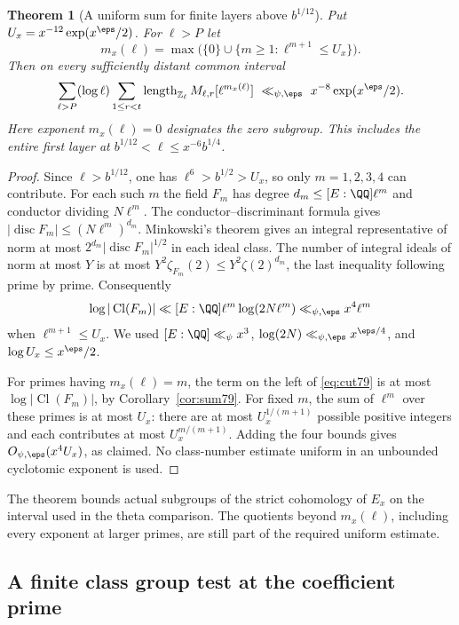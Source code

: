 \documentclass[a4paper,11pt]{article}
\newtheorem{theorem}[proposition]{Theorem}
\theoremstyle{definition}
\theoremstyle{remark}
\newcommand{\ZZ}{\mathbb Z}\newcommand{\ord}{\operatorname{ord}}
\newcommand{\len}{\operatorname{length}}\newcommand{\Res}{\operatorname*{Res}}
\numberwithin{equation}{section}
\newcommand{\Cl}{\operatorname{Cl}}
\begin{document}
\begin{theorem}[A uniform sum for finite layers above \(b^{1/12}\)]
\label{thm:cut79}
Put \(U_x=x^{-12}\exp(x^\eps/2)\). For \(\ell>P\) let
\[
  m_x(\ell)=\max\bigl(\{0\}\cup
                     \{m\ge1:\ell^{m+1}\le U_x\}\bigr).
\]
Then on every sufficiently distant common interval
\begin{equation}
 \sum_{\ell>P}(\log\ell)\sum_{1\le r<t}
       \len_{\ZZ_\ell} M_{\ell,r}[\ell^{m_x(\ell)}]
    \ \ll_{\psi,\eps}\ x^{-8}\exp(x^\eps/2).
 \label{eq:cut79}
\end{equation}
Here exponent \(m_x(\ell)=0\) designates the zero subgroup.
This includes the entire first layer at
\(b^{1/12}<\ell\le x^{-6}b^{1/4}\).
\end{theorem}
\begin{proof}
Since \(\ell>b^{1/12}\), one has \(\ell^6>b^{1/2}>U_x\), so
only \(m=1,2,3,4\) can contribute. For each such \(m\) the
field \(F_m\) has degree \(d_m\le[E:\QQ]\ell^m\) and conductor
dividing \(N\ell^m\). The conductor--discriminant formula gives
\(|\operatorname{disc}F_m|\le(N\ell^m)^{d_m}\).
Minkowski's theorem gives an integral representative of norm
at most \(2^{d_m}|\operatorname{disc}F_m|^{1/2}\) in each
ideal class. The number of integral ideals of norm at most \(Y\)
is at most \(Y^2\zeta_{F_m}(2)\le Y^2\zeta(2)^{d_m}\),
the last inequality following prime by prime. Consequently
\[
       \log|\Cl(F_m)|\ll [E:\QQ]\ell^m\log(2N\ell^m)
                           \ll_{\psi,\eps} x^4\ell^m
\]
when \(\ell^{m+1}\le U_x\). We used \([E:\QQ]\ll_\psi x^3\),
\(\log(2N)\ll_{\psi,\eps}x^{\eps/4}\), and
\(\log U_x\le x^\eps/2\).

For primes having \(m_x(\ell)=m\), the term on the left of
\eqref{eq:cut79} is at most \(\log|\Cl(F_m)|\), by
Corollary~\ref{cor:sum79}. For fixed \(m\), the sum of
\(\ell^m\) over these primes is at most
\(U_x\): there are at most \(U_x^{1/(m+1)}\) possible positive
integers and each contributes at most \(U_x^{m/(m+1)}\).
Adding the four bounds gives \(O_{\psi,\eps}(x^4U_x)\), as
claimed. No class-number estimate uniform in an unbounded
cyclotomic exponent is used.
\end{proof}

The theorem bounds actual subgroups of the strict cohomology
of \(E_x\) on the interval used in the theta comparison. The
quotients beyond \(m_x(\ell)\), including every exponent at
larger primes, are still part of the required uniform estimate.

\subsection{A finite class group test at the coefficient prime}\label{nav:III-14}
\label{sec:ray101}
\end{document}
